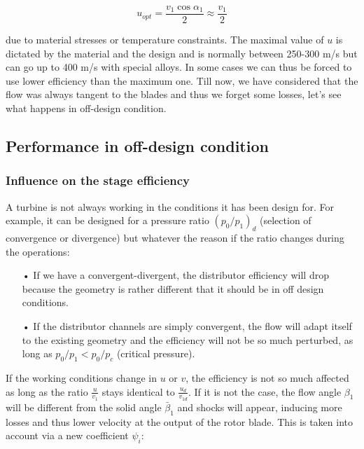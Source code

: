 \begin{equation}
u_{opt} = \frac{v_1\cos \alpha _1}{2} \approx \frac{v_1}{2}
\end{equation}

due to material stresses or temperature constraints. The maximal value of $u$ is dictated by the material and the design and is normally between 250-300 m/s but can go up to 400 m/s with special alloys. In some cases we can thus be forced to use lower efficiency than the maximum one. Till now, we have considered that the flow was always tangent to the blades and thus we forget some losses, let's see what happens in off-design condition. 

\subsection{Performance in off-design condition}
\subsubsection{Influence on the stage efficiency}
A turbine is not always working in the conditions it has been design for. For example, it can be designed for a pressure ratio $(p_0/p_1)_d$ (selection of convergence or divergence) but whatever the reason if the ratio changes during the operations:\\

\begin{itemize}
\item[•] If we have a convergent-divergent, the distributor efficiency will drop because the geometry is rather different that it should be in off design conditions. 

\item[•] If the distributor channels are simply convergent, the flow will adapt itself to the existing geometry and the efficiency will not be so much perturbed, as long as $p_0/p_1 < p_0/p_c$ (critical pressure).\\ 
\end{itemize}  

If the working conditions change in $u$ or $v$, the efficiency is not so much affected as long as the ratio $\frac{u}{v_1}$ stays identical to $\frac{u_d}{v_{1d}}$. If it is not the case, the flow angle $\beta _1$ will be different from the solid angle $\bar{\beta}_1$ and shocks will appear, inducing more losses and thus lower velocity at the output of the rotor blade. This is taken into account via a new coefficient $\psi _i$: 

